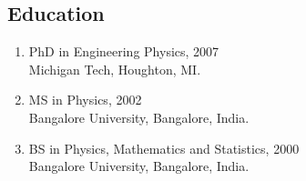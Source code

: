 %
\subsection*{Education} 

\begin{enumerate}
  \item \textsf{PhD in Engineering Physics}, 2007\\
        Michigan Tech, Houghton, MI.

  \item \textsf{MS in Physics}, 2002\\
        Bangalore University, Bangalore, India.

  \item \textsf{BS in Physics, Mathematics and Statistics}, 2000\\
        Bangalore University, Bangalore, India.
\end{enumerate}
